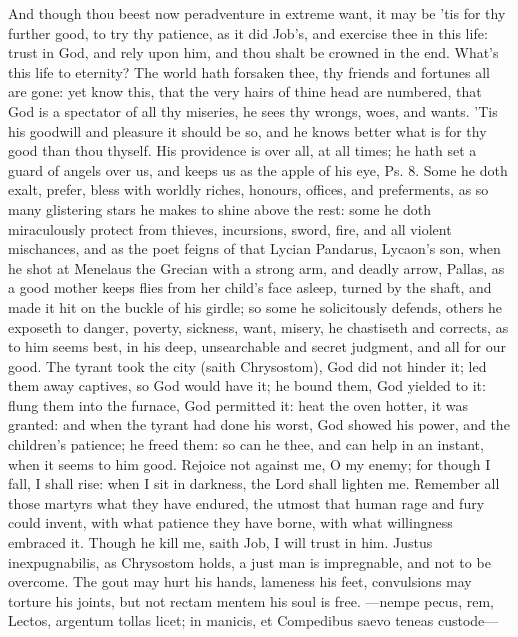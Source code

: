 {And though thou beest now peradventure in extreme want, it may be
'tis for thy further good, to try thy patience, as it did Job's, and
exercise thee in this life: trust in God, and rely upon him, and thou
shalt be crowned in the end. What's this life to eternity? The
world hath forsaken thee, thy friends and fortunes all are gone: yet
know this, that the very hairs of thine head are numbered, that God is
a spectator of all thy miseries, he sees thy wrongs, woes, and wants.
'Tis his goodwill and pleasure it should be so, and he knows
better what is for thy good than thou thyself. His providence is over
all, at all times; he hath set a guard of angels over us, and keeps us
as the apple of his eye, Ps.  8. Some he doth exalt, prefer, bless
with worldly riches, honours, offices, and preferments, as so many
glistering stars he makes to shine above the rest: some he doth
miraculously protect from thieves, incursions, sword, fire, and all
violent mischances, and as the poet feigns of that Lycian
Pandarus, Lycaon's son, when he shot at Menelaus the Grecian with a
strong arm, and deadly arrow, Pallas, as a good mother keeps flies from
her child's face asleep, turned by the shaft, and made it hit on the
buckle of his girdle; so some he solicitously defends, others he
exposeth to danger, poverty, sickness, want, misery, he chastiseth and
corrects, as to him seems best, in his deep, unsearchable and secret
judgment, and all for our good. The tyrant took the city (saith
Chrysostom), God did not hinder it; led them away captives, so
God would have it; he bound them, God yielded to it: flung them into
the furnace, God permitted it: heat the oven hotter, it was granted:
and when the tyrant had done his worst, God showed his power, and the
children's patience; he freed them: so can he thee, and can help
in an instant, when it seems to him good.  Rejoice not against
me, O my enemy; for though I fall, I shall rise: when I sit in
darkness, the Lord shall lighten me. Remember all those martyrs what
they have endured, the utmost that human rage and fury could invent,
with what patience they have borne, with what willingness
embraced it. Though he kill me, saith Job, I will trust in him. Justus
inexpugnabilis, as Chrysostom holds, a just man is impregnable,
and not to be overcome. The gout may hurt his hands, lameness his feet,
convulsions may torture his joints, but not rectam mentem his soul is
free.
---nempe pecus, rem,
Lectos, argentum tollas licet; in manicis, et
Compedibus saevo teneas custode---

}
